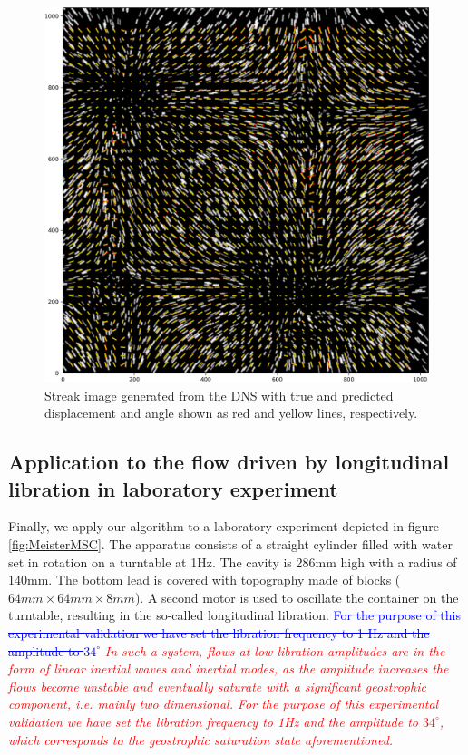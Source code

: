 \documentclass{svjour3}                     %
\newcommand{\new}[1]{\textit{\textcolor{red}{#1}}}
\newcommand{\old}[1]{\textcolor{blue}{\sout{#1}}}
\begin{document}
\begin{figure}
\includegraphics[width=\textwidth]{figs/figure7.png}
\caption{Streak image generated from the DNS with true and predicted displacement and angle shown as red and yellow lines, respectively.}
\label{fig:fig8}
\end{figure}

\subsection{Application to the flow driven by longitudinal libration in laboratory experiment}\label{experiment}
Finally, we apply our algorithm to a laboratory experiment depicted in figure \ref{fig:MeisterMSC}. The apparatus consists of a straight cylinder filled with water set in rotation on a turntable at 1Hz. The cavity is 286mm high with a radius of 140mm. The bottom lead is covered with topography made of blocks ($64mm\times64mm\times 8mm$). A second motor is used to oscillate the container on the turntable, resulting in the so-called longitudinal libration.
\old{For the purpose of this experimental validation we have set the libration frequency to 1 Hz and the amplitude to $34^{\circ}$} \new{In such a system, flows at low libration amplitudes are in the form of linear inertial waves and inertial modes, as the amplitude increases the flows become unstable and eventually saturate with a significant geostrophic component, i.e. mainly two dimensional. For the purpose of this experimental validation we have set the libration frequency to 1Hz and the amplitude to $34^{\circ}$, which corresponds to the geostrophic saturation state aforementioned. }
\end{document}
